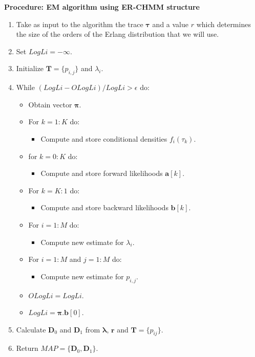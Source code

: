 \documentclass[a4paper,11pt,titlepage]{article}
\begin{document}
\textbf{Procedure: EM algorithm using ER-CHMM structure}

\begin{enumerate}
    \item Take as input to the algorithm the trace $\bm{\tau}$ and a value $r$ which determines the size of the orders of the Erlang distribution that we will use.
    \item Set $LogLi=-\infty$.
    \item Initialize $\mathbf{T} = \{p_{i,j}\}$ and $\lambda_i$.
    \item While $(LogLi-OLogLi)/LogLi > \epsilon$ do:
    \begin{itemize}
        \item Obtain vector $\bm{\pi}$.
        \item For $k = 1:K$ do:
        \begin{itemize}
            \item Compute and store conditional densities $f_i(\tau_k)$.
        \end{itemize}
        \item for $k=0:K$ do:
        \begin{itemize}
            \item Compute and store forward likelihoods $\mathbf{a}[k]$.
        \end{itemize}
        \item For $k=K:1$ do:
        \begin{itemize}
            \item Compute and store backward likelihoods $\mathbf{b}[k]$.
        \end{itemize}
        \item For $i=1:M$ do:
        \begin{itemize}
            \item Compute new estimate for $\lambda_i$.
        \end{itemize}
        \item For $i=1:M$ and $j=1:M$ do:
        \begin{itemize}
            \item Compute new estimate for $p_{i,j}$.
        \end{itemize}
        \item $OLogLi = LogLi$.
        \item $LogLi = \bm{\pi}.\mathbf{b}[0]$.
    \end{itemize}
    \item Calculate $\mathbf{D}_0$ and $\mathbf{D}_1$ from $\bm{\lambda}$, $\mathbf{r}$ and $\mathbf{T} =\{p_{ij}\}$.
    \item Return $MAP = \{\mathbf{D}_0,\mathbf{D}_1\}$.
\end{enumerate}
\end{document}

